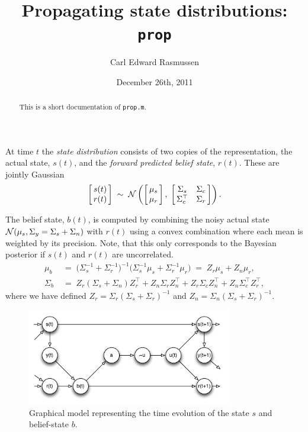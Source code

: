 \documentclass{article}
\title{Propagating state distributions: \texttt{prop}}
\author{Carl Edward Rasmussen}
\date{December 26th, 2011}
\begin{document}
\maketitle

\begin{abstract}
This is a short documentation of \texttt{prop.m}.
\end{abstract}

At time $t$ the \emph{state distribution} consists of two copies of
the representation, the actual state, $s(t)$, and the \emph{forward
  predicted belief state}, $r(t)$. These are jointly Gaussian
\[
\left[\!\!\begin{array}{c}s(t)\\r(t)\end{array}\!\!\right]\;\sim\;
{\cal N}\left(\left[\!\!\begin{array}{c}\mu_s\\ \mu_r\end{array}\!\!\right],\;
\left[\!\!\begin{array}{cc}\Sigma_s&\Sigma_c\\ \Sigma_c^\top&\Sigma_r\end{array}\!\!\right]\right).
\]

The belief state, $b(t)$, is computed by combining the noisy actual
state ${\cal N}(\mu_s,\Sigma_y=\Sigma_s+\Sigma_n)$ with $r(t)$ using a
convex combination where each mean is weighted by its precision. Note,
that this only corresponds to the Bayesian posterior if $s(t)$ and
$r(t)$ are uncorrelated.
\[
\begin{split}
\mu_b\;&=\;\big(\Sigma_s^{-1}+\Sigma_r^{-1}\big)^{-1}\big(\Sigma_s^{-1}\mu_s+\Sigma_r^{-1}\mu_r\big)
\;=\;Z_r\mu_s+Z_n\mu_r,\\
\Sigma_b\;&=\;Z_r(\Sigma_s+\Sigma_n)Z_r^\top + Z_n\Sigma_rZ_n^\top +
 Z_r\Sigma_cZ_n^\top + Z_n\Sigma_c^\top Z_r^\top,
\end{split}
\]
where we have defined $Z_r=\Sigma_r(\Sigma_s+\Sigma_r)^{-1}$ and
$Z_n=\Sigma_n(\Sigma_s+\Sigma_r)^{-1}$.

\begin{figure}[ht]
\centerline{\includegraphics[width=0.8\textwidth]{prop1.pdf}}
\caption{Graphical model representing the time evolution of the state $s$
  and belief-state $b$.}
\end{figure}
\end{document}

